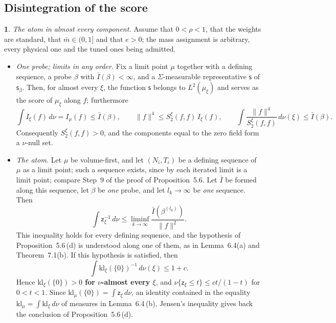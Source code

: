 \documentclass[11pt]{amsart}
\newcommand{\namedhead}{}
\theoremstyle{definition}
\newtheorem*{namedinner}{\namedhead}
\newenvironment{named}[1]{\renewcommand{\namedhead}{#1}\begin{namedinner}}{\end{namedinner}}
\begin{document}
\subsection{Disintegration of the score}
\begin{named}{Theorem 7.1}
\emph{The atom in almost every component.}
Assume that $0<\rho<1$, that the weights are standard, that $\bar m\in(0,1]$ and that $e>0$;
the mass assignment is arbitrary, every physical one and the tuned ones being admitted.
\begin{itemize}
\item[(a)] \emph{One probe; limits in any order.}
Fix a limit point $\mu$ together with a defining sequence, a probe $\beta$ with $\bar I(\beta)<\infty$, and a $\Sigma$-measurable representative $\mathsf s$ of $\mathsf s_\beta$.
Then, for almost every $\xi$, the function $\mathsf s$ belongs to $L^2(\mu_\xi)$ and serves as the score of $\mu_\xi$ along $f$;
furthermore
\begin{equation*}
\int I_\xi(f)\,d\nu=I_\mu(f)\le\bar I(\beta),\qquad\|f\|^4\le S_2^\xi(f,f)\,I_\xi(f),\qquad\int\frac{\|f\|^4}{S_2^\xi(f,f)}\,d\nu(\xi)\le\bar I(\beta).
\end{equation*}
Consequently $S_2^\xi(f,f)>0$, and the components equal to the zero field form a $\nu$-null set.
\item[(b)] \emph{The atom.}
Let $\mu$ be volume-first, and let $(N_i,T_i)$ be a defining sequence of $\mu$ as a limit point;
such a sequence exists, since by \cite[Theorem~1.3\,(a)]{QEDII} each iterated limit is a limit point;
compare Step~9 of the proof of Proposition~5.6.
Let $\bar I$ be formed along this sequence, let $\beta$ be \emph{one} probe, and let $l_k\to\infty$ be \emph{one} sequence.
Then
\begin{equation*}
\int\mathsf z_\xi^{-1}\,d\nu\le\liminf_{k\to\infty}\frac{\bar I(\beta^{(l_k)})}{\|f\|^2}.
\end{equation*}
This inequality holds for every defining sequence, and the hypothesis of Proposition~5.6\,(d) is understood along one of them, as in Lemma~6.4(a) and Theorem~7.1(b).
If this hypothesis is satisfied, then
\begin{equation*}
\int\mathrm{kl}_\xi(\{0\})^{-1}\,d\nu(\xi)\le1+c.
\end{equation*}
Hence \textbf{$\mathrm{kl}_\xi(\{0\})>0$ for $\nu$-almost every $\xi$}, and $\nu\{\mathsf z_\xi\le t\}\le ct/(1-t)$ for $0<t<1$.
Since $\mathrm{kl}_\mu(\{0\})=\int\mathsf z_\xi\,d\nu$, an identity contained in the equality $\mathrm{kl}_\mu=\int\mathrm{kl}_\xi\,d\nu$ of measures in Lemma~6.4\,(b), Jensen's inequality gives back the conclusion of Proposition~5.6\,(d).

\end{itemize}
\end{named}
\end{document}
